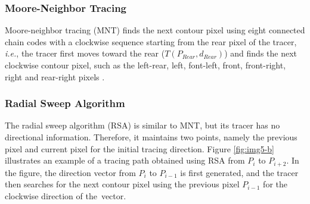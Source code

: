 \documentclass[sensors,article,accept,moreauthors,pdftex,10pt,a4paper]{mdpi}
\newcommand{\JHMEMO}[1]{\textcolor{red}{#1}}
\begin{document}
\subsubsection{Moore-Neighbor Tracing}
Moore-neighbor tracing (MNT) finds the next contour pixel using eight connected chain codes with a clockwise sequence starting from the rear pixel of the tracer, \emph{i.e.}, the tracer first moves toward the rear ($T (P_{Rear}, d_{Rear})$) and finds the next clockwise contour pixel, such as the left-rear, left, font-left, front, front-right, right and rear-right pixels \cite{Toussaint????Grids, Ghuneim2015Contour}. 


\subsubsection{Radial Sweep Algorithm}

The radial sweep algorithm (RSA) \cite{Mirante1982Radial} is similar to MNT, but its tracer has no directional information. Therefore, it maintains two points, namely the previous pixel and current pixel for the initial tracing direction. Figure \ref{fig:img5-b} illustrates an example of a tracing path obtained using RSA from $P_i$ to $P_{i+2}$. In the figure, the direction vector from $P_i$ to $P_{i-1}$ is first generated, and the tracer then searches for the next contour pixel using the previous pixel $P_{i-1}$ for the clockwise direction of the~vector.
\end{document}
